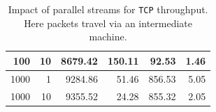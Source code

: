 \documentclass[12pt,a4paper,twoside,openright]{report}
\begin{document}
\begin{table}[H]
\begin{tabular}{|r|r|r|r|r|r|}
100                                                                                              & 10                                                                                                                         & 8679.42                                                                                                                                         & 150.11                                                                                                                           & 92.53                                                                                                    & 1.46                                                                                                                             \\ \hline
1000                                                                                             & 1                                                                                                                          & 9284.86                                                                                                                                         & 51.46                                                                                                                            & 856.53                                                                                                   & 5.05                                                                                                                             \\ \hline
1000                                                                                             & 10                                                                                                                         & 9355.52                                                                                                                                         & 24.28                                                                                                                            & 855.32                                                                                                   & 2.05                                                                                                                             \\ \hline
\end{tabular}
    \centering
    \caption[Impact of parallel streams for \texttt{TCP} throughput]{Impact of parallel streams for \texttt{TCP} throughput. Here packets travel via an intermediate machine.}
    \label{fig:TCP_throughput_via_B_using_parallel_streams}
\end{table}
\end{document}
